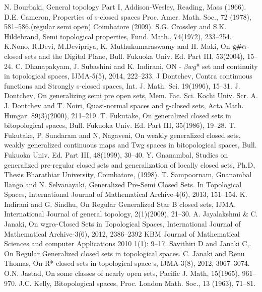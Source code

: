 \begin{thebibliography}{99}
 N. Bourbaki, General topology Part I, Addison-Wesley, Reading, Mass (1966).
 D.E. Cameron, Properties of s-closed spaces Proc. Amer. Math. Soc., 72 (1978), 581--586.(regular semi open) Coimbatore (2009).
 S.G. Crossley and S.K. Hildebrand, Semi topological properties, Fund. Math., 74(1972), 233--254.
 K.Nono, R.Devi, M.Devipriya, K. Muthukumaraswamy and H. Maki, On $\mathrm{g}\#\alpha$-closed sets and the Digital Plane, Bull. Fukuoka Univ. Ed. Part III, 53(2004), 15--24.
 C. Dhanapakyam, J. Subashini and K. Indirani, ON - $\beta wg$* set and continuity in topological spaces, IJMA-5(5), 2014, 222--233.
 J Dontchev, Contra continuous functions and Strongly s-closed spaces, Int. J. Math. Sci. 19(1996), 15--31.
 J. Dontchev, On generalizing semi pre open sets, Mem. Fac. Sci. Kochi Univ. Scr. A. 
 J. Dontchev and T. Noiri, Quasi-normal spaces and g-closed sets, Acta Math. Hungar. 89(3)(2000), 211--219.
 T. Fukutake, On generalized closed sets in bitopological spaces, Bull. Fukuoka Univ. Ed. Part III, 35(1986), 19--28.
 T. Fukutake, P. Sundaram and N, Nagaveni, On weakly generalized closed sets, weakly generalized continuous maps and Twg spaces in bitopological spaces, Bull. Fukuoka Univ. Ed. Part III, 48(1999), 30--40.
 Y. Gnanambal, Studies on generalized pre-regular closed sets and generalization of locally closed sets, Ph.D, Thesis Bharathiar University, Coimbatore, (1998).
 T. Sampoornam, Gnanambal Ilango and N. Selvanayaki, Generalized Pre-Semi Closed Sets. In Topological Spaces, International Journal of Mathematical Archive-4(6), 2013, 151--154.
 K. Indirani and G. Sindhu, On Regular Generalized Star B closed sets, IJMA. International Journal of general topology, 2(1)(2009), 21--30.
 A. Jayalakshmi  \& C. Janaki, On wgr$\alpha$-Closed Sets in Topological Spaces, International Journal of Mathematical Archive-3(6), 2012, 2386--2392 KBM  Journal of Mathematical Sciences and computer Applications 2010 1(1): 9--17.
 Savithiri D and Janaki C,. On Regular Generalized closed sets in topological spaces.
 C. Janaki and Renu Thomas, On R* closed sets in topological space s, IJMA-3(8), 2012, 3067--3074.
 O.N. Jastad, On some classes of nearly open sets, Pacific J. Math, 15(1965), 961--970.
 J.C. Kelly, Bitopological spaces, Proc. London Math. Soc., 13 (1963), 71--81.

\end{thebibliography}
